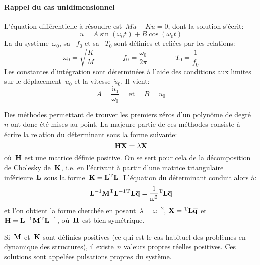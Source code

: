 \paragraph{Rappel du cas unidimensionnel}
L'équation différentielle à résoudre est~$M\ddot{u}+Ku=0$, dont la solution s'écrit: \begin{equation} u=A\sin (\omega_0 t)+B\cos(\omega_0 t) \end{equation}
La  du système~$\omega_0$, sa ~$f_0$ et sa ~$T_0$ sont définies et reliées par les relations:
\begin{equation}
\omega_0=\sqrt{\dfrac{K}M} \qquad\qquad f_0=\dfrac{\omega_0}{2\pi} \qquad\qquad T_0=\dfrac1{f_0}
\end{equation}
Les constantes d'intégration sont déterminées à l'aide des conditions aux limites sur le déplacement~$u_0$ et la
vitesse~$\dot{u}_0$. Il vient: \begin{equation} A=\frac{\dot{u}_0}{\omega_0} \quad\text{ et }\quad B=u_0\end{equation}

\medskip{}
Des méthodes permettant de trouver les premiers zéros d'un polynôme de degré~$n$ ont donc été mises au point. La majeure partie de ces méthodes consiste à écrire la relation du déterminant sous la forme suivante:
\begin{equation} \MM{H}\VV{X}=\lambda\VV{X} \end{equation}
où~$\MM{H}$ est une matrice définie positive.
\medskipvm
On se sert pour cela de la décomposition de Cholesky de~$\MM{K}$, i.e. en l'écrivant à partir d'une matrice triangulaire inférieure~$\MM{L}$ sous la forme~$\MM{K}=\MM{L}\MMT{L}$.
\medskipvm
L'équation du déterminant conduit alors à:
\begin{equation} \MMI{L}\MM{M}\MMIT{L}\MMT{L}\VV{\overline{q}}=\frac1{\omega^2}\MMT{L}\VV{\overline{q}} \end{equation}
et l'on obtient la forme cherchée en posant~$\lambda=\omega^{-2}$, $\VV{X}=\MMT{L}\VV{\overline{q}}$
et~$\MM{H}=\MMI{L}\MM{M}\MMIT{L}$, où~$\MM{H}$ est bien symétrique.

\medskip
{}
Si~$\MM{M}$ et~$\MM{K}$ sont définies positives (ce qui est le cas habituel des problèmes en dynamique des structures), il existe~$n$ valeurs propres réelles positives. Ces solutions sont appelées pulsations propres du système.

